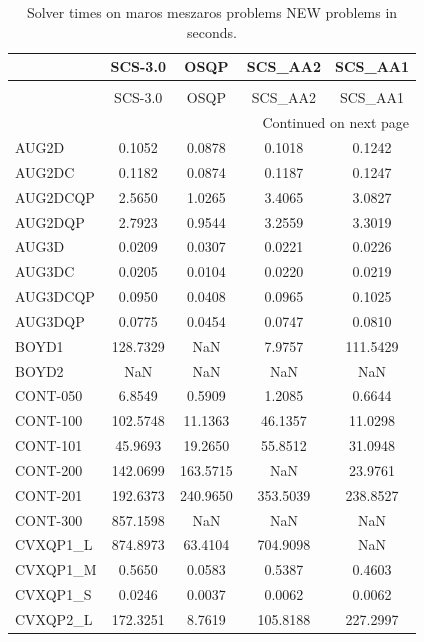 \begin{longtable}{lcccc}
\caption{Solver times on maros meszaros problems NEW problems in seconds.}
\label{t-maros meszaros problems NEW-results}\\
\toprule
{} &  SCS-3.0 &     OSQP &  SCS\_AA2 &  SCS\_AA1 \\
\midrule
\endfirsthead
\caption[]{Solver times on maros meszaros problems NEW problems in seconds.} \\
\toprule
{} &  SCS-3.0 &     OSQP &  SCS\_AA2 &  SCS\_AA1 \\
\midrule
\endhead
\midrule
\multicolumn{5}{r}{{Continued on next page}} \\
\midrule
\endfoot

\bottomrule
\endlastfoot
AUG2D    &   0.1052 &   0.0878 &   0.1018 &   0.1242 \\
AUG2DC   &   0.1182 &   0.0874 &   0.1187 &   0.1247 \\
AUG2DCQP &   2.5650 &   1.0265 &   3.4065 &   3.0827 \\
AUG2DQP  &   2.7923 &   0.9544 &   3.2559 &   3.3019 \\
AUG3D    &   0.0209 &   0.0307 &   0.0221 &   0.0226 \\
AUG3DC   &   0.0205 &   0.0104 &   0.0220 &   0.0219 \\
AUG3DCQP &   0.0950 &   0.0408 &   0.0965 &   0.1025 \\
AUG3DQP  &   0.0775 &   0.0454 &   0.0747 &   0.0810 \\
BOYD1    & 128.7329 &      NaN &   7.9757 & 111.5429 \\
BOYD2    &      NaN &      NaN &      NaN &      NaN \\
CONT-050 &   6.8549 &   0.5909 &   1.2085 &   0.6644 \\
CONT-100 & 102.5748 &  11.1363 &  46.1357 &  11.0298 \\
CONT-101 &  45.9693 &  19.2650 &  55.8512 &  31.0948 \\
CONT-200 & 142.0699 & 163.5715 &      NaN &  23.9761 \\
CONT-201 & 192.6373 & 240.9650 & 353.5039 & 238.8527 \\
CONT-300 & 857.1598 &      NaN &      NaN &      NaN \\
CVXQP1\_L & 874.8973 &  63.4104 & 704.9098 &      NaN \\
CVXQP1\_M &   0.5650 &   0.0583 &   0.5387 &   0.4603 \\
CVXQP1\_S &   0.0246 &   0.0037 &   0.0062 &   0.0062 \\
CVXQP2\_L & 172.3251 &   8.7619 & 105.8188 & 227.2997 \\

\end{longtable}
